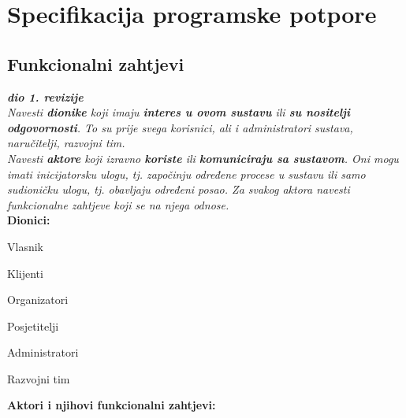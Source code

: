 \chapter{Specifikacija programske potpore}
		
	\section{Funkcionalni zahtjevi}
			
			\textbf{\textit{dio 1. revizije}}\\
			
			\textit{Navesti \textbf{dionike} koji imaju \textbf{interes u ovom sustavu} ili  \textbf{su nositelji odgovornosti}. To su prije svega korisnici, ali i administratori sustava, naručitelji, razvojni tim.}\\
				
			\textit{Navesti \textbf{aktore} koji izravno \textbf{koriste} ili \textbf{komuniciraju sa sustavom}. Oni mogu imati inicijatorsku ulogu, tj. započinju određene procese u sustavu ili samo sudioničku ulogu, tj. obavljaju određeni posao. Za svakog aktora navesti funkcionalne zahtjeve koji se na njega odnose.}\\
			
			
			\noindent \textbf{Dionici:}
			
			\begin{packed_enum}
				
				\item Vlasnik
				\item Klijenti
				\begin{packed_enum}
					\item Organizatori
					\item Posjetitelji
				\end{packed_enum}				
				\item Administratori
				\item Razvojni tim
				
			\end{packed_enum}
			
			\noindent \textbf{Aktori i njihovi funkcionalni zahtjevi:}

